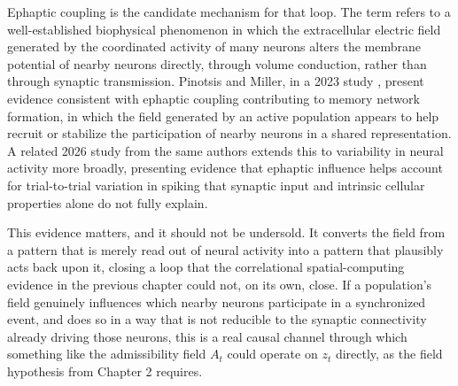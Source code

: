 \documentclass[11pt]{book}
\begin{document}
Ephaptic coupling is the candidate mechanism for that loop. The term refers to a well-established biophysical phenomenon in which the extracellular electric field generated by the coordinated activity of many neurons alters the membrane potential of nearby neurons directly, through volume conduction, rather than through synaptic transmission. Pinotsis and Miller, in a 2023 study \cite{pinotsis2023}, present evidence consistent with ephaptic coupling contributing to memory network formation, in which the field generated by an active population appears to help recruit or stabilize the participation of nearby neurons in a shared representation. A related 2026 study from the same authors \cite{pinotsis2026} extends this to variability in neural activity more broadly, presenting evidence that ephaptic influence helps account for trial-to-trial variation in spiking that synaptic input and intrinsic cellular properties alone do not fully explain.

This evidence matters, and it should not be undersold. It converts the field from a pattern that is merely read out of neural activity into a pattern that plausibly acts back upon it, closing a loop that the correlational spatial-computing evidence in the previous chapter could not, on its own, close. If a population's field genuinely influences which nearby neurons participate in a synchronized event, and does so in a way that is not reducible to the synaptic connectivity already driving those neurons, this is a real causal channel through which something like the admissibility field $A_t$ could operate on $z_t$ directly, as the field hypothesis from Chapter 2 requires.
\end{document}
